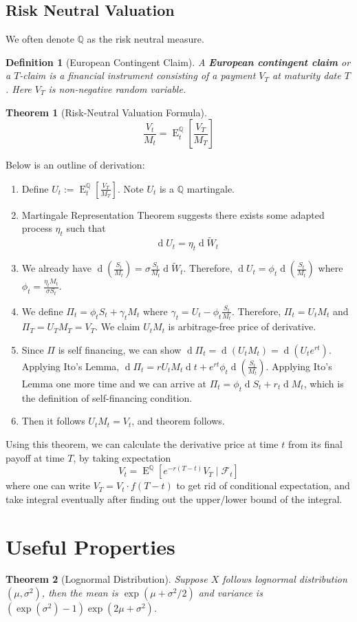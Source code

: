 \documentclass[12pt]{article}
\newtheorem{definition}{Definition}[section]
\newtheorem{theorem}{Theorem}[section]
\theoremstyle{definition}
\DeclareMathOperator{\diff}{d}
\DeclareMathOperator{\expec}{E}
\begin{document}
\subsection{Risk Neutral Valuation}
We often denote $\mathbb{Q}$ as the risk neutral measure.
\begin{definition}[European Contingent Claim]
\normalfont A \textbf{European contingent claim} or a $T$-claim is a financial instrument consisting of a payment $V_T$ at maturity date $T$. Here $V_T$ is non-negative random variable.
\end{definition}
\begin{theorem}[Risk-Neutral Valuation Formula]
\normalfont \[
\frac{V_t}{M_t}=\expec_t^\mathbb{Q}[\frac{V_T}{M_T}]
\]
\end{theorem}
Below is an outline of derivation:
\begin{enumerate}
  \item Define $U_t:=\expec_t^\mathbb{Q}[\frac{V_T}{M_T}]$. Note $U_t$ is a $\mathbb{Q}$ martingale.
  \item Martingale Representation Theorem suggests there exists some adapted process $\eta_t$ such that
  \[
\diff U_t=\eta_t\diff \tilde{W}_t
  \]
  \item We already have $\diff (\frac{S_t}{M_t})=\sigma\frac{S_t}{M_t}\diff \tilde{W}_t$. Therefore, $\diff U_t=\phi_t\diff(\frac{S_t}{M_t})$ where $\phi_t=\frac{\eta_t M_t}{\sigma S_t}$.
  \item We define $\Pi_t=\phi_tS_t+\gamma_tM_t$ where $\gamma_t=U_t-\phi_t\frac{S_t}{M_t}$. Therefore, $\Pi_t=U_tM_t$ and $\Pi_T=U_TM_T=V_T$. We claim $U_tM_t$ is arbitrage-free price of derivative.
  \item Since $\Pi$ is self financing, we can show $\diff \Pi_t=\diff(U_tM_t)=\diff(U_t e^{rt})$. Applying Ito's Lemma, $\diff \Pi_t = rU_tM_t\diff t + e^{rt}\phi_t\diff (\frac{S_t}{M_t})$. Applying Ito's Lemma one more time and we can arrive at $\Pi_t=\phi_t\diff S_t+r_t\diff M_t$, which is the definition of self-financing condition.
  \item Then it follows $U_tM_t=V_t$, and theorem follows.
\end{enumerate}
Using this theorem, we can calculate the derivative price at time $t$ from its final payoff at time $T$, by taking expectation
\[
V_t=\expec^\mathbb{Q}[e^{-r(T-t)}V_T\mid \mathcal{F}_t]
\]
where one can write $V_T=V_t\cdot f(T-t)$ to get rid of conditional expectation, and take integral eventually after finding out the upper/lower bound of the integral.
\section{Useful Properties}
\begin{theorem}[Lognormal Distribution]
Suppose $X$ follows lognormal distribution$(\mu, \sigma^2)$, then the mean is $\exp(\mu+\sigma^2/2)$ and variance is $(\exp(\sigma^2)-1)\exp(2\mu+\sigma^2)$.
\end{theorem}
\end{document}

